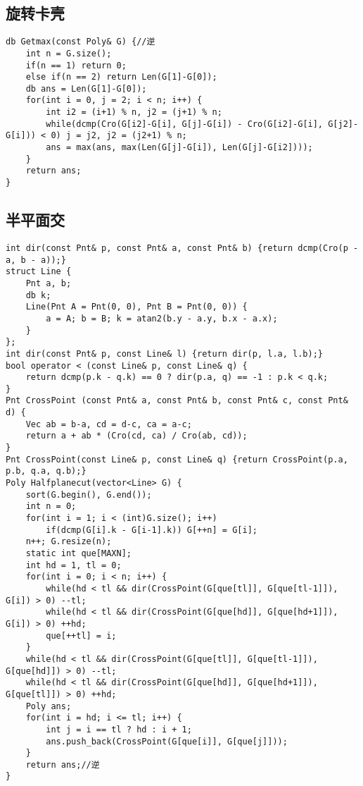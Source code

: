 \documentclass{article}
\begin{document}
   \subsection{旋转卡壳}
   \begin{lstlisting}
db Getmax(const Poly& G) {//逆
	int n = G.size();
	if(n == 1) return 0;
	else if(n == 2) return Len(G[1]-G[0]);
	db ans = Len(G[1]-G[0]);
	for(int i = 0, j = 2; i < n; i++) {
		int i2 = (i+1) % n, j2 = (j+1) % n;
		while(dcmp(Cro(G[i2]-G[i], G[j]-G[i]) - Cro(G[i2]-G[i], G[j2]-G[i])) < 0) j = j2, j2 = (j2+1) % n;
		ans = max(ans, max(Len(G[j]-G[i]), Len(G[j]-G[i2])));
	}
	return ans;
}
   \end{lstlisting}
   \subsection{半平面交}
\begin{lstlisting}
int dir(const Pnt& p, const Pnt& a, const Pnt& b) {return dcmp(Cro(p - a, b - a));}
struct Line {
	Pnt a, b;
	db k;
	Line(Pnt A = Pnt(0, 0), Pnt B = Pnt(0, 0)) {
		a = A; b = B; k = atan2(b.y - a.y, b.x - a.x);
	}
};
int dir(const Pnt& p, const Line& l) {return dir(p, l.a, l.b);}
bool operator < (const Line& p, const Line& q) {
	return dcmp(p.k - q.k) == 0 ? dir(p.a, q) == -1 : p.k < q.k;
}
Pnt CrossPoint (const Pnt& a, const Pnt& b, const Pnt& c, const Pnt& d) {
	Vec ab = b-a, cd = d-c, ca = a-c;
	return a + ab * (Cro(cd, ca) / Cro(ab, cd));
}
Pnt CrossPoint(const Line& p, const Line& q) {return CrossPoint(p.a, p.b, q.a, q.b);}
Poly Halfplanecut(vector<Line> G) {
	sort(G.begin(), G.end());
	int n = 0;
	for(int i = 1; i < (int)G.size(); i++)
		if(dcmp(G[i].k - G[i-1].k)) G[++n] = G[i];
	n++; G.resize(n);
	static int que[MAXN];
	int hd = 1, tl = 0;
	for(int i = 0; i < n; i++) {
		while(hd < tl && dir(CrossPoint(G[que[tl]], G[que[tl-1]]), G[i]) > 0) --tl;
		while(hd < tl && dir(CrossPoint(G[que[hd]], G[que[hd+1]]), G[i]) > 0) ++hd;
		que[++tl] = i;
	}
	while(hd < tl && dir(CrossPoint(G[que[tl]], G[que[tl-1]]), G[que[hd]]) > 0) --tl;
	while(hd < tl && dir(CrossPoint(G[que[hd]], G[que[hd+1]]), G[que[tl]]) > 0) ++hd;
	Poly ans;
	for(int i = hd; i <= tl; i++) {
		int j = i == tl ? hd : i + 1;
		ans.push_back(CrossPoint(G[que[i]], G[que[j]]));
	}
	return ans;//逆
}
\end{lstlisting}
\end{document}
